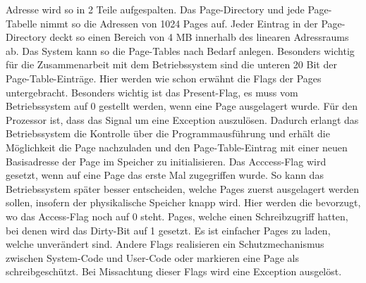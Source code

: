 ﻿\documentclass[12pt]{book}
\begin{document}
Adresse wird so in 2 Teile aufgespalten. Das Page-Directory und jede
Page-Tabelle nimmt so die Adressen von 1024 Pages auf. Jeder Eintrag in der
Page-Directory deckt so einen Bereich von 4 MB innerhalb des linearen
Adressraums ab. Das System kann so die Page-Tables nach Bedarf anlegen.
Besonders wichtig für die Zusammenarbeit mit dem Betriebssystem sind die unteren
20 Bit der Page-Table-Einträge. Hier werden wie schon erwähnt die Flags der
Pages untergebracht. Besonders wichtig ist das Present-Flag, es muss vom
Betriebssystem auf 0 gestellt werden, wenn eine Page ausgelagert wurde. Für den
Prozessor ist, dass das Signal um eine Exception auszulösen. Dadurch erlangt das
Betriebssystem die Kontrolle über die Programmausführung und erhält die
Möglichkeit die Page nachzuladen und den Page-Table-Eintrag mit einer neuen
Basisadresse der Page im Speicher zu initialisieren. Das Acccess-Flag wird
gesetzt, wenn auf eine Page das erste Mal zugegriffen wurde. So kann das
Betriebssystem später besser entscheiden, welche Pages zuerst ausgelagert werden
sollen, insofern der physikalische Speicher knapp wird. Hier werden die
bevorzugt, wo das Access-Flag noch auf 0 steht. Pages, welche einen
Schreibzugriff hatten, bei denen wird das Dirty-Bit auf 1 gesetzt. Es ist
einfacher Pages zu laden, welche unverändert sind. Andere Flags realisieren ein
Schutzmechanismus zwischen System-Code und User-Code oder markieren eine Page
als schreibgeschützt. Bei Missachtung dieser Flags wird eine Exception
ausgelöst.
\end{document}
